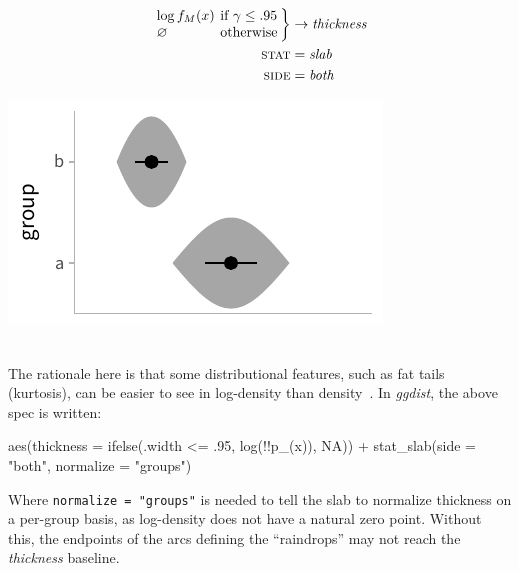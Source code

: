 \documentclass[journal]{vgtc}                     %
\newenvironment{centerverbatim}{%
\setlength{\parskip}{.4\belowdisplayskip}%
\vspace{.55\abovedisplayskip}%
\noindent%
\small%
\centering%
\varwidth{\linewidth}%
\verbatim
}{%
\endverbatim%
\endvarwidth%
\par%
\hfill\break%
}
\newcommand{\equationfigure}[2]{%
\noindent
\begin{minipage}{.5\columnwidth}
\setlength{\abovedisplayskip}{0pt}
\setlength{\belowdisplayskip}{0pt}
#1\end{minipage}%
\begin{minipage}{.4\columnwidth}\centering #2 \end{minipage}%
\vspace{.5\belowdisplayskip}\\
}
\begin{document}
\equationfigure{
\begin{align*}
\arraycolsep=2pt \left.\begin{array}{ll} \log f_M(x) & \textrm{if } \gamma \le .95\\ \varnothing & \textrm{otherwise}\end{array}\right\} &\rightarrow \textit{thickness}\\
\textsc{stat} &= \mathit{slab}\\
\textsc{side} &= \mathit{both}
\end{align*}
}{\includegraphics[width=1.2\columnwidth]{figs/3-slab_raindrop.pdf}}
The rationale here is that some distributional features, such as fat tails (kurtosis), can be easier to see in log-density than density~\cite{barrowman2003raindrop}. In \textit{ggdist}, the above spec is written:

\begin{centerverbatim}
aes(thickness = ifelse(.width <= .95, log(!!p_(x)), NA)) +
stat_slab(side = "both", normalize = "groups")
\end{centerverbatim}
Where \texttt{normalize = "groups"} is needed to tell the slab to normalize thickness on a per-group basis, as log-density does not have a natural zero point. Without this, the endpoints of the arcs defining the ``raindrops'' may not reach the \textit{thickness} baseline.
\end{document}
